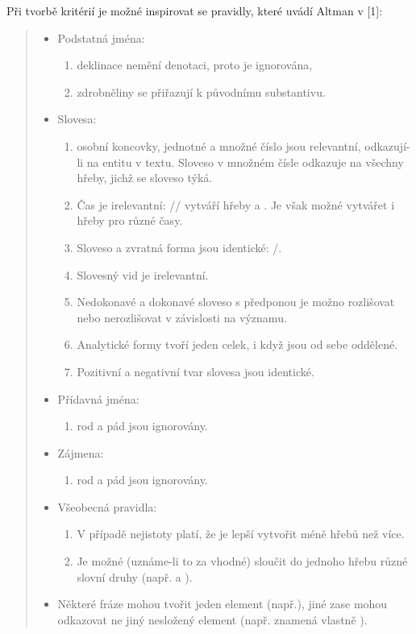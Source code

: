 Při tvorbě kritérií je možné inspirovat se pravidly, které uvádí Altman v [1]:
\begin{quote}
\begin{itemize}
\item Podstatná jména:
\begin{enumerate}
\item deklinace nemění denotaci, proto je ignorována,
\item zdrobněliny se přiřazují k původnímu substantivu.
\end{enumerate}
\item Slovesa:
\begin{enumerate}
\item osobní koncovky, jednotné a množné číslo jsou relevantní, odkazují-li na entitu v textu. Sloveso v množném čísle odkazuje na všechny hřeby, jichž se sloveso týká.
\item Čas je irelevantní: // vytváří hřeby  a . Je však možné vytvářet i hřeby pro různé časy.
\item Sloveso a zvratná forma jsou identické: /.
\item Slovesný vid je irelevantní.
\item Nedokonavé a dokonavé sloveso s předponou je možno rozlišovat nebo nerozlišovat v závislosti na významu.
\item Analytické formy tvoří jeden celek, i když jsou od sebe oddělené.
\item Pozitivní a negativní tvar slovesa jsou identické.
\end{enumerate}
\item Přídavná jména:
\begin{enumerate}
\item rod a pád jsou ignorovány.
\end{enumerate}
\item Zájmena:
\begin{enumerate}
\item rod a pád jsou ignorovány.
\end{enumerate}
\item Všeobecná pravidla:
\begin{enumerate}
\item V případě nejistoty platí, že je lepší vytvořit méně hřebů než více.
\item Je možné (uznáme-li to za vhodné) sloučit do jednoho hřebu různé slovní druhy (např.  a ).
\end{enumerate}
\item Některé fráze mohou tvořit jeden element (např.), jiné zase mohou odkazovat ne jiný nesložený element (např.  znamená vlastně ).
\end{itemize}
\end{quote}

